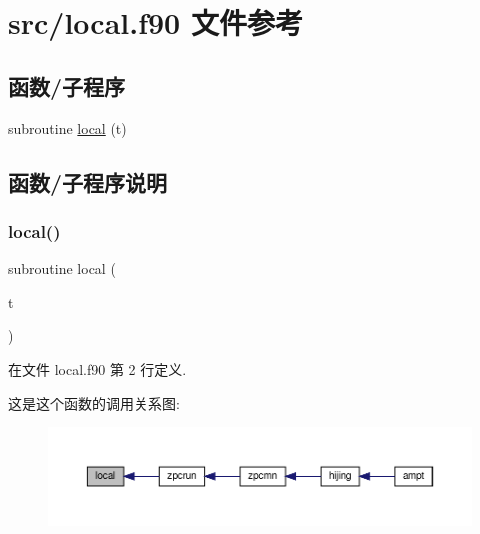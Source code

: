 \hypertarget{local_8f90}{}\section{src/local.f90 文件参考}
\label{local_8f90}
\subsection*{函数/子程序}
\begin{DoxyCompactItemize}
\item 
subroutine \mbox{\hyperlink{local_8f90_a8dccb5715a762070908318288e95dbcc}{local}} (t)
\end{DoxyCompactItemize}


\subsection{函数/子程序说明}
\mbox{\label{local_8f90_a8dccb5715a762070908318288e95dbcc}} 
\subsubsection{\texorpdfstring{local()}{local()}}
{\footnotesize\ttfamily subroutine local (\begin{DoxyParamCaption}\item[{}]{t }\end{DoxyParamCaption})}



在文件 local.\+f90 第 2 行定义.

这是这个函数的调用关系图\+:
\nopagebreak
\begin{figure}[H]
\begin{center}
\leavevmode
\includegraphics[width=350pt]{local_8f90_a8dccb5715a762070908318288e95dbcc_icgraph}
\end{center}
\end{figure}
